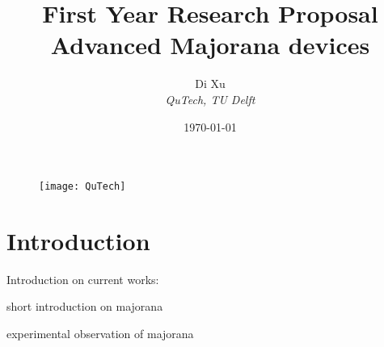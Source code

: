 \documentclass[prl]{article}
\title{{\small First Year Research Proposal}\\[0.3cm]Advanced Majorana devices}
\author{Di Xu\\\textit{QuTech, TU Delft}}
\date{\today}
\begin{document}
\maketitle
\begin{figure}[!h]
\begin{center}
	\texttt{[image: QuTech]}
\end{center}
\end{figure}
\thispagestyle{empty}
\newpage
\section{Introduction}

Introduction on current works:

short introduction on majorana

experimental observation of majorana

\\
\end{document}
